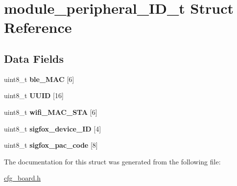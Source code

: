 \hypertarget{structmodule__peripheral___i_d__t}{}\section{module\+\_\+peripheral\+\_\+\+I\+D\+\_\+t Struct Reference}
\label{structmodule__peripheral___i_d__t}
\subsection*{Data Fields}
\begin{DoxyCompactItemize}
\item 
\mbox{\label{structmodule__peripheral___i_d__t_aa4cedc85c97e6e55e16dbe5fb1d62689}} 
uint8\+\_\+t {\bfseries ble\+\_\+\+M\+AC} \mbox{[}6\mbox{]}
\item 
\mbox{\label{structmodule__peripheral___i_d__t_a414378ace9198797d96ba624749060e0}} 
uint8\+\_\+t {\bfseries U\+U\+ID} \mbox{[}16\mbox{]}
\item 
\mbox{\label{structmodule__peripheral___i_d__t_a4313075308b1f19621f4562496e6d730}} 
uint8\+\_\+t {\bfseries wifi\+\_\+\+M\+A\+C\+\_\+\+S\+TA} \mbox{[}6\mbox{]}
\item 
\mbox{\label{structmodule__peripheral___i_d__t_a9f0453085443998238bc4f7fccef7528}} 
uint8\+\_\+t {\bfseries sigfox\+\_\+device\+\_\+\+ID} \mbox{[}4\mbox{]}
\item 
\mbox{\label{structmodule__peripheral___i_d__t_af447c41c88bb8c2880045209b1074210}} 
uint8\+\_\+t {\bfseries sigfox\+\_\+pac\+\_\+code} \mbox{[}8\mbox{]}
\end{DoxyCompactItemize}


The documentation for this struct was generated from the following file\+:\begin{DoxyCompactItemize}
\item 
\hyperlink{cfg__board_8h}{cfg\+\_\+board.\+h}\end{DoxyCompactItemize}
